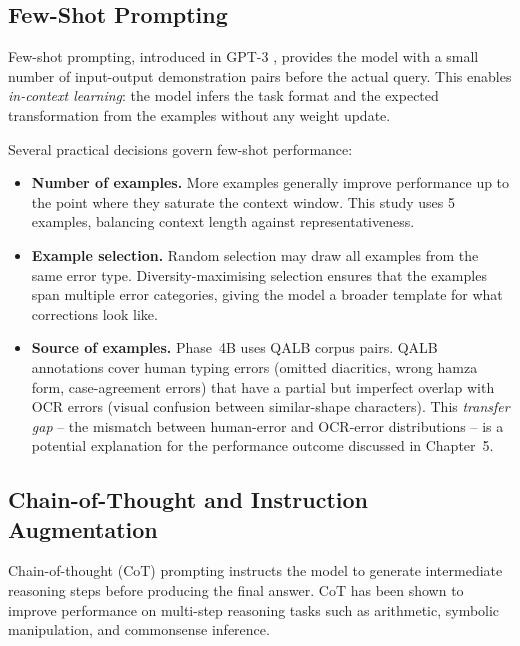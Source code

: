 \subsection{Few-Shot Prompting}
\label{subsec:few_shot}

Few-shot prompting, introduced in GPT-3 \cite{brown2020language}, provides
the model with a small number of input-output demonstration pairs before the
actual query.
This enables \emph{in-context learning}: the model infers the task format and
the expected transformation from the examples without any weight update.

Several practical decisions govern few-shot performance:

\begin{itemize}
  \item \textbf{Number of examples.}
        More examples generally improve performance up to the point where they
        saturate the context window.
        This study uses 5 examples, balancing context length against
        representativeness.

  \item \textbf{Example selection.}
        Random selection may draw all examples from the same error type.
        Diversity-maximising selection ensures that the examples span multiple
        error categories, giving the model a broader template for what
        corrections look like.

  \item \textbf{Source of examples.}
        Phase~4B uses QALB corpus pairs.
        QALB annotations cover human typing errors (omitted diacritics, wrong
        hamza form, case-agreement errors) that have a partial but imperfect
        overlap with OCR errors (visual confusion between similar-shape characters).
        This \emph{transfer gap} -- the mismatch between human-error and OCR-error
        distributions -- is a potential explanation for the performance outcome
        discussed in Chapter~5.
\end{itemize}

\subsection{Chain-of-Thought and Instruction Augmentation}
\label{subsec:cot}

Chain-of-thought (CoT) prompting \cite{wei2022chain} instructs the model to
generate intermediate reasoning steps before producing the final answer.
CoT has been shown to improve performance on multi-step reasoning tasks such as
arithmetic, symbolic manipulation, and commonsense inference.

